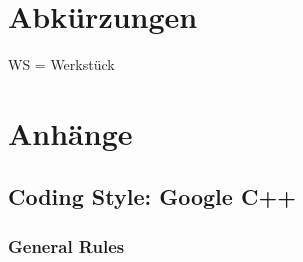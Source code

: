 \documentclass[oneside,a4paper,titlepage]{scrartcl} %
\begin{document}
\section{Abkürzungen}
WS = Werkstück\\

\section{Anhänge}

\subsection{Coding Style: Google C++}

\subsubsection{General Rules}
\end{document}
